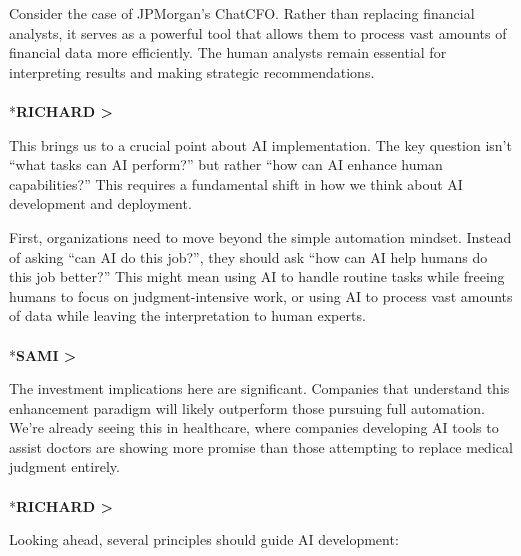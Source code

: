 \documentclass[
  Letterpaper,
]{scrbook}
\makeatletter
\let\oldparagraph\paragraph
\renewcommand{\paragraph}{
    \@ifstar
      \xxxParagraphStar
      \xxxParagraphNoStar
  }
\newcommand{\xxxParagraphStar}[1]{\oldparagraph*{#1}\mbox{}}
\newcommand{\xxxParagraphNoStar}[1]{\oldparagraph{#1}\mbox{}}
\makeatother
\begin{document}
Consider the case of JPMorgan's ChatCFO. Rather than replacing financial
analysts, it serves as a powerful tool that allows them to process vast
amounts of financial data more efficiently. The human analysts remain
essential for interpreting results and making strategic recommendations.

\paragraph*{\texorpdfstring{\textbf{RICHARD
\textgreater{}}}{RICHARD \textgreater{}}}\label{richard-1}

This brings us to a crucial point about AI implementation. The key
question isn't ``what tasks can AI perform?'' but rather ``how can AI
enhance human capabilities?'' This requires a fundamental shift in how
we think about AI development and deployment.

First, organizations need to move beyond the simple automation mindset.
Instead of asking ``can AI do this job?'', they should ask ``how can AI
help humans do this job better?'' This might mean using AI to handle
routine tasks while freeing humans to focus on judgment-intensive work,
or using AI to process vast amounts of data while leaving the
interpretation to human experts.

\paragraph*{\texorpdfstring{\textbf{SAMI
\textgreater{}}}{SAMI \textgreater{}}}\label{sami-1}

The investment implications here are significant. Companies that
understand this enhancement paradigm will likely outperform those
pursuing full automation. We're already seeing this in healthcare, where
companies developing AI tools to assist doctors are showing more promise
than those attempting to replace medical judgment entirely.

\paragraph*{\texorpdfstring{\textbf{RICHARD
\textgreater{}}}{RICHARD \textgreater{}}}\label{richard-2}

Looking ahead, several principles should guide AI development:
\end{document}
